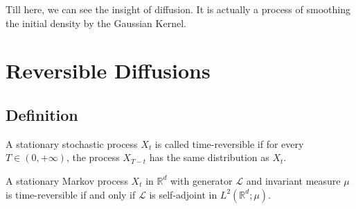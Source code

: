 Till here, we can see the insight of diffusion. It is actually a process of smoothing the initial density by the Gaussian Kernel.


\section{Reversible Diffusions}
\subsection{Definition}
\begin{definition}
    A stationary stochastic process $X_t$ is called time-reversible 
    if for every $T\in (0, +\infty)$, the process $X_{T-t}$ has the same distribution as $X_t$.
\end{definition}

\begin{theorem}
    A stationary Markov process $X_t$ in $\mathbb{R}^d$ with generator $\mathcal{L}$ and invariant measure $\mu$ is time-reversible 
    if and only if $\mathcal{L}$ is self-adjoint in $L^2(\mathbb{R}^d; \mu)$.
\end{theorem}

